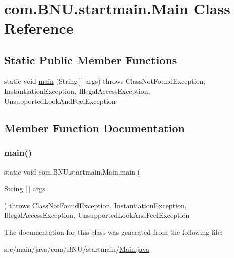\hypertarget{classcom_1_1_b_n_u_1_1startmain_1_1_main}{}\section{com.\+B\+N\+U.\+startmain.\+Main Class Reference}
\label{classcom_1_1_b_n_u_1_1startmain_1_1_main}
\subsection*{Static Public Member Functions}
\begin{DoxyCompactItemize}
\item 
static void \mbox{\hyperlink{classcom_1_1_b_n_u_1_1startmain_1_1_main_ad9718afb1e74122d26cf0794e760cc6b}{main}} (String\mbox{[}$\,$\mbox{]} args)  throws Class\+Not\+Found\+Exception, Instantiation\+Exception, Illegal\+Access\+Exception, Unsupported\+Look\+And\+Feel\+Exception     
\end{DoxyCompactItemize}


\subsection{Member Function Documentation}
\mbox{\label{classcom_1_1_b_n_u_1_1startmain_1_1_main_ad9718afb1e74122d26cf0794e760cc6b}} 
\subsubsection{\texorpdfstring{main()}{main()}}
{\footnotesize\ttfamily static void com.\+B\+N\+U.\+startmain.\+Main.\+main (\begin{DoxyParamCaption}\item[{String \mbox{[}$\,$\mbox{]}}]{args }\end{DoxyParamCaption}) throws Class\+Not\+Found\+Exception, Instantiation\+Exception, Illegal\+Access\+Exception, Unsupported\+Look\+And\+Feel\+Exception\hspace{0.3cm}{\ttfamily [static]}}



The documentation for this class was generated from the following file\+:\begin{DoxyCompactItemize}
\item 
src/main/java/com/\+B\+N\+U/startmain/\mbox{\hyperlink{_main_8java}{Main.\+java}}\end{DoxyCompactItemize}
